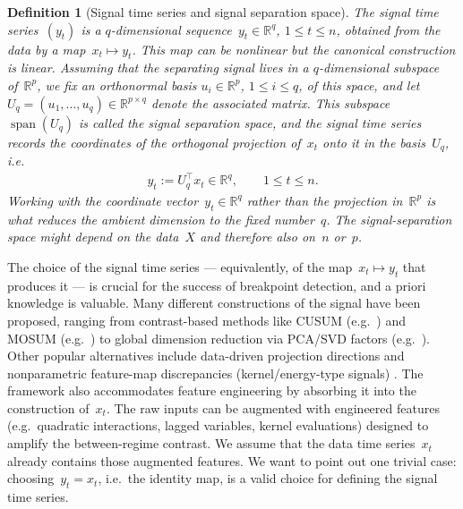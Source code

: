 \documentclass[10pt, letterpaper]{amsart}
\DeclareMathOperator{\Span}{span}
\newtheorem{defn}[theorem]{Definition}
\begin{document}
\begin{defn}[Signal time series and signal separation space] \label{def:signal_separation_space}
    The \emph{signal time series}~$(y_t)$ is a $q$-dimensional sequence~$y_t\in\mathbb R^q$, $1\le t\le n$, obtained from the data by a map~$x_t\mapsto y_t$. This map can be nonlinear but the canonical construction is linear. Assuming that the separating signal lives in a $q$-dimensional subspace of~$\mathbb{R}^p$, we fix an orthonormal basis $u_i\in\mathbb R^{p}$, $1\le i\le q$, of this space, and let $U_q=(u_1,\dots,u_q)\in\mathbb R^{p\times q}$ denote the
associated matrix. This subspace~$\Span(U_q)$ is called the \emph{signal separation space}, and the signal time series records the coordinates of the orthogonal projection of~$x_t$ onto it in the basis~$U_q$, i.e.
    \begin{align}
   y_t := U_q^{\top} x_t \in \mathbb{R}^q, \qquad 1\le t\le n.
\end{align}
Working with the coordinate vector~$y_t\in\mathbb R^q$ rather than the projection in~$\mathbb R^p$ is what reduces the ambient dimension to the fixed number~$q$. The signal-separation space might depend on the data~$X$ and therefore also on~$n$ or~$p$.
\end{defn}

The choice of the signal time series --- equivalently, of the map~$x_t\mapsto y_t$ that produces it --- is crucial for the success of breakpoint detection, and a priori knowledge is valuable. Many different constructions of the signal have been proposed, ranging from contrast-based methods like CUSUM (e.g.~\cite{Page1954,BassevilleNikiforov1993}) and MOSUM (e.g.~\cite{chu1995mosum,CsorgoHorvath1997}) to global dimension reduction via PCA/SVD factors (e.g.~\cite{BaiHanShi2020,DuanBaiHan2023}). Other popular alternatives include data-driven projection directions \cite{WangSamworth2018} and nonparametric feature-map discrepancies (kernel/energy-type signals) \cite{GrettonEtAl2012,MattesonJames2014}. The framework also accommodates feature engineering by absorbing it into the construction of~$x_t$. The raw inputs can be augmented with engineered features (e.g.~quadratic interactions, lagged variables, kernel evaluations) designed to amplify the between-regime contrast. We assume that the data time series~$x_t$ already contains those augmented features. We want to point out one trivial case: choosing~$y_t= x_t$, i.e.~the identity map, is a valid choice for defining the signal time series.   
\end{document}
